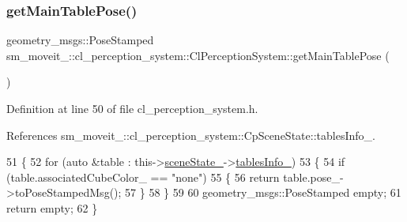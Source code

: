 \subsubsection{\texorpdfstring{get\+Main\+Table\+Pose()}{getMainTablePose()}}
{\footnotesize\ttfamily geometry\+\_\+msgs\+::\+Pose\+Stamped sm\+\_\+moveit\+\_\+::cl\+\_\+perception\+\_\+system\+::\+Cl\+Perception\+System\+::get\+Main\+Table\+Pose (\begin{DoxyParamCaption}{ }\end{DoxyParamCaption})\hspace{0.3cm}{\ttfamily [inline]}}



Definition at line 50 of file cl\+\_\+perception\+\_\+system.\+h.



References sm\+\_\+moveit\+\_\+::cl\+\_\+perception\+\_\+system\+::\+Cp\+Scene\+State\+::tables\+Info\+\_\+.


\begin{DoxyCode}
51             \{
52                 \textcolor{keywordflow}{for} (\textcolor{keyword}{auto} &table : this->\hyperlink{classsm__moveit__4_1_1cl__perception__system_1_1ClPerceptionSystem_a82ea8feeb2fa43349f91ed59137b3890}{sceneState\_}->\hyperlink{classsm__moveit__4_1_1cl__perception__system_1_1CpSceneState_a95f74dd16566d97e017650ccdf4b8a46}{tablesInfo\_})
53                 \{
54                     \textcolor{keywordflow}{if} (table.associatedCubeColor\_ == \textcolor{stringliteral}{"none"})
55                     \{
56                         \textcolor{keywordflow}{return} table.pose\_->toPoseStampedMsg();
57                     \}
58                 \}
59 
60                 geometry\_msgs::PoseStamped empty;
61                 \textcolor{keywordflow}{return} empty;
62             \}
\end{DoxyCode}
\mbox{\label{classsm__moveit__4_1_1cl__perception__system_1_1ClPerceptionSystem_ac4b944cebb2055a85a33129665df5dcf}} 
